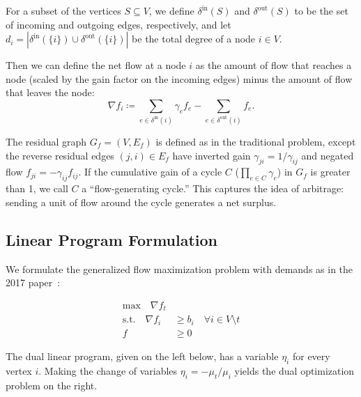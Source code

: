 \documentclass[11pt]{article}
\theoremstyle{definition}
\theoremstyle{definition}
\newcommand{\nfi}{\nabla f_i}
\newcommand{\din}{\delta^{\text{in}}}
\newcommand{\dout}{\delta^{\text{out}}}
\newcommand{\rewrite}[1]{#1}%
\begin{document}
	For a subset of the vertices $S \subseteq V$, we define $\din(S)$ and
	$\dout(S)$ to be the set of incoming and outgoing edges, respectively,
	and let $d_i = |\din(\{i\}) \cup \dout(\{i\})|$ be the total degree of a
	node $i \in V$.

	Then we can define the net flow at a node $i$ as the amount of flow that
	reaches a node (scaled by the gain factor on the incoming edges) minus the
	amount of flow that leaves the node: 
	$$ \nfi \coloneqq \sum_{e \in \din(i)} \gamma_e f_e - \sum_{e \in \dout(i)} f_e.$$

	The residual graph $G_f = (V,E_f)$ is defined as in the traditional problem,
	except the reverse residual edges $(j,i) \in E_f$ have inverted gain 
	$\gamma_{ji} = 1 / \gamma_{ij}$ and negated flow $f_{ji} =
	-\gamma_{ij}f_{ij}$. If the cumulative gain of a cycle $C$ ($\prod_{e \in C} \gamma_e$)
	in $G_f$ is greater than 1, we call $C$ a ``flow-generating cycle.'' 
	This captures the idea of arbitrage: sending a unit of flow around the cycle
	generates a net surplus.





	\subsection{Linear Program Formulation}
	\label{sec:lp}

	We formulate the generalized flow maximization problem with demands as in the 2017
	paper~\cite{Olver2017}:
	\vspace{-0.35cm}
%
%

    \begin{align*}\tag{P}
    \text{max} \quad
    \nabla f_t& \\
    \text{s.t.} \quad
    \nabla f_i &\geq b_i \quad \forall i \in V \setminus t \\
    f &\geq 0
    \end{align*}

	The dual linear program, given on the left below, has a variable $\eta_i$ for
	every vertex $i$. 
	Making the change of variables $\eta_i = - \mu_t / \mu_i$ yields the
	dual optimization problem on the right.
    \vspace{0.5cm}
\end{document}
